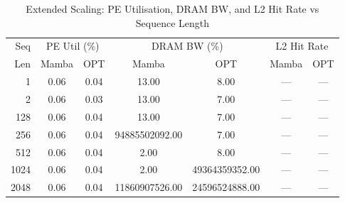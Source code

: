 \begin{table}[h]\centering
    \caption{Extended Scaling: PE Utilisation, DRAM BW, and L2 Hit Rate vs Sequence Length}
    \label{tab:seq_scaling_extended}
    \begin{tabular}{r cc cc cc}\hline
        Seq & \multicolumn{2}{c}{PE Util (\%)} & \multicolumn{2}{c}{DRAM BW (\%)} & \multicolumn{2}{c}{L2 Hit Rate} \\
    Len & Mamba & OPT & Mamba & OPT & Mamba & OPT \\\hline
        1 & 0.06 & 0.04 & 13.00 & 8.00 & --- & --- \\
        2 & 0.06 & 0.03 & 13.00 & 7.00 & --- & --- \\
      128 & 0.06 & 0.04 & 13.00 & 7.00 & --- & --- \\
      256 & 0.06 & 0.04 & 94885502092.00 & 7.00 & --- & --- \\
      512 & 0.06 & 0.04 & 2.00 & 8.00 & --- & --- \\
     1024 & 0.06 & 0.04 & 2.00 & 49364359352.00 & --- & --- \\
     2048 & 0.06 & 0.04 & 11860907526.00 & 24596524888.00 & --- & --- \\
\hline\end{tabular}\end{table}